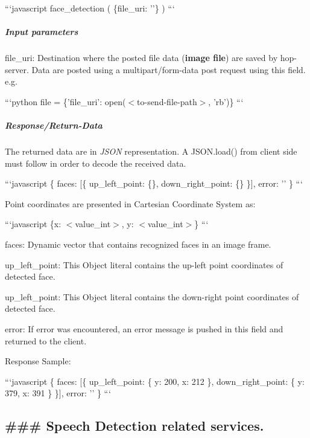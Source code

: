 ```javascript face\-\_\-detection ( \{file\-\_\-uri\-: ''\} ) ```

\subparagraph*{Input parameters}


\begin{DoxyItemize}
\item file\-\_\-uri\-: Destination where the posted file data ({\bfseries image file}) are saved by hop-\/server. Data are posted using a multipart/form-\/data post request using this field. e.\-g.
\end{DoxyItemize}

```python file = \{'file\-\_\-uri'\-: open($<$to-\/send-\/file-\/path$>$, 'rb')\} ```

\subparagraph*{Response/\-Return-\/\-Data}

The returned data are in {\itshape J\-S\-O\-N} representation. A J\-S\-O\-N.\-load() from client side must follow in order to decode the received data.

```javascript \{ faces\-: \mbox{[}\{ up\-\_\-left\-\_\-point\-: \{\}, down\-\_\-right\-\_\-point\-: \{\} \}\mbox{]}, error\-: '' \} ```

Point coordinates are presented in Cartesian Coordinate System as\-:

```javascript \{x\-: $<$value\-\_\-int$>$, y\-: $<$value\-\_\-int$>$\} ```


\begin{DoxyItemize}
\item faces\-: Dynamic vector that contains recognized faces in an image frame.
\item up\-\_\-left\-\_\-point\-: This Object literal contains the up-\/left point coordinates of detected face.
\item up\-\_\-left\-\_\-point\-: This Object literal contains the down-\/right point coordinates of detected face.
\item error\-: If error was encountered, an error message is pushed in this field and returned to the client.
\end{DoxyItemize}

Response Sample\-:

```javascript \{ faces\-: \mbox{[}\{ up\-\_\-left\-\_\-point\-: \{ y\-: 200, x\-: 212 \}, down\-\_\-right\-\_\-point\-: \{ y\-: 379, x\-: 391 \} \}\mbox{]}, error\-: '' \} ```

\subsection*{\#\#\# Speech Detection related services. }

